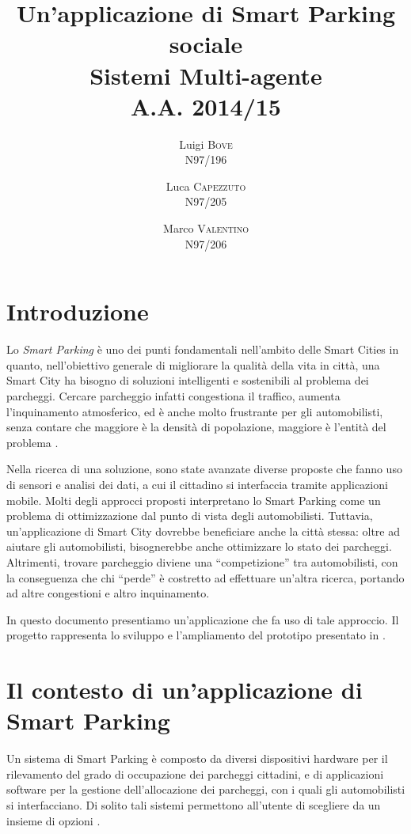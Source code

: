 \documentclass[11pt,a4paper,twoside]{article}
\title{
    Un'applicazione di Smart Parking sociale\\
    \vspace{.5cm}
    \large Sistemi Multi-agente\\
    \vspace{.5cm}
    \normalsize {\fontsize{10}{12}\selectfont A.A.} 2014/15
    \vspace{.25cm}
}
\author{
    Luigi \textsc{Bove}\\
    {\fontsize{11.25}{13.5}\selectfont N}97/196
    \and
    Luca \textsc{Capezzuto}\\
    {\fontsize{11.25}{13.5}\selectfont N}97/205
    \and
    Marco \textsc{Valentino}\\
    {\fontsize{11.25}{13.5}\selectfont N}97/206
}
\date{}
\numberwithin{figure}{section}
\numberwithin{equation}{section}
\begin{document}
\maketitle
\thispagestyle{empty}
\newpage

\section{Introduzione}

Lo \emph{Smart Parking} è uno dei punti fondamentali nell'ambito delle Smart Cities in quanto, nell'obiettivo generale di migliorare la qualità della vita in città, una Smart City ha bisogno di soluzioni intelligenti e sostenibili al problema dei parcheggi.
Cercare parcheggio infatti congestiona il traffico, aumenta l'inquinamento atmosferico, ed è anche molto frustrante per gli automobilisti, senza contare che maggiore è la densità di popolazione, maggiore è l'entità del problema \cite{1}.

Nella ricerca di una soluzione, sono state avanzate diverse proposte che fanno uso di sensori e analisi dei dati, a cui il cittadino si interfaccia tramite applicazioni mobile.
Molti degli approcci proposti interpretano lo Smart Parking come un problema di ottimizzazione dal punto di vista degli automobilisti. Tuttavia, un'applicazione di Smart City dovrebbe beneficiare anche la città stessa: oltre ad aiutare gli automobilisti, bisognerebbe anche ottimizzare lo stato dei parcheggi. Altrimenti, trovare parcheggio diviene una ``competizione'' tra automobilisti, con la conseguenza che chi ``perde'' è costretto ad effettuare un'altra ricerca, portando ad altre congestioni e altro inquinamento.

In questo documento presentiamo un'applicazione che fa uso di tale approccio.
Il progetto rappresenta lo sviluppo e l'ampliamento del prototipo presentato in \cite{2}.

\section{Il contesto di un'applicazione di Smart Parking}

Un sistema di Smart Parking è composto da diversi dispositivi hardware per il rilevamento del grado di occupazione dei parcheggi cittadini, e di applicazioni software per la gestione dell'allocazione dei parcheggi, con i quali gli automobilisti si interfacciano.
Di solito tali sistemi permettono all'utente di scegliere da un insieme di opzioni \cite{3}.
\end{document}
